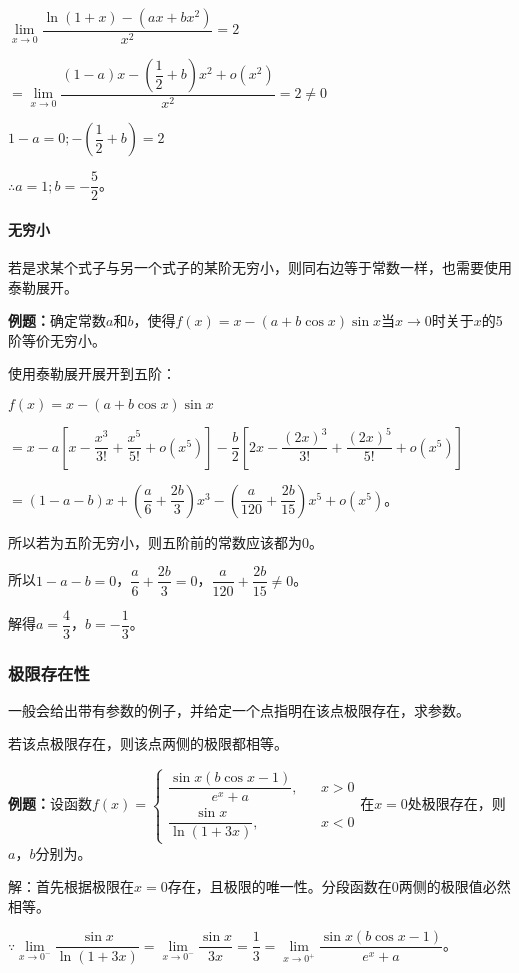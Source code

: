 \documentclass[UTF8, 12pt]{ctexart}
\begin{document}
$\lim\limits_{x\to 0}\dfrac{\ln(1+x)-(ax+bx^2)}{x^2}=2$

$=\lim\limits_{x\to 0}\dfrac{(1-a)x-\left(\dfrac{1}{2}+b\right)x^2+o(x^2)}{x^2}=2\neq 0$

$1-a=0;-\left(\dfrac{1}{2}+b\right)=2$\medskip

$\therefore a=1;b=-\dfrac{5}{2}$。

\paragraph{无穷小} \leavevmode \medskip

若是求某个式子与另一个式子的某阶无穷小，则同右边等于常数一样，也需要使用泰勒展开。

\textbf{例题：}确定常数$a$和$b$，使得$f(x)=x-(a+b\cos x)\sin x$当$x\to 0$时关于$x$的5阶等价无穷小。

使用泰勒展开展开到五阶：

$f(x)=x-(a+b\cos x)\sin x$

$=x-a\left[x-\dfrac{x^3}{3!}+\dfrac{x^5}{5!}+o(x^5)\right]-\dfrac{b}{2}\left[2x-\dfrac{(2x)^3}{3!}+\dfrac{(2x)^5}{5!}+o(x^5)\right]$

$=(1-a-b)x+\left(\dfrac{a}{6}+\dfrac{2b}{3}\right)x^3-\left(\dfrac{a}{120}+\dfrac{2b}{15}\right)x^5+o(x^5)$。\medskip

所以若为五阶无穷小，则五阶前的常数应该都为0。

所以$1-a-b=0$，$\dfrac{a}{6}+\dfrac{2b}{3}=0$，$\dfrac{a}{120}+\dfrac{2b}{15}\neq0$。

解得$a=\dfrac{4}{3}$，$b=-\dfrac{1}{3}$。

\subsubsection{极限存在性}

一般会给出带有参数的例子，并给定一个点指明在该点极限存在，求参数。

若该点极限存在，则该点两侧的极限都相等。\medskip

\textbf{例题：}设函数$f(x)=\left\{\begin{array}{lcl}
    \dfrac{\sin x(b\cos x-1)}{e^x+a}, & & x>0 \\
    \dfrac{\sin x}{\ln(1+3x)}, & & x<0
\end{array}
\right.$在$x=0$处极限存在，则$a$，$b$分别为。

解：首先根据极限在$x=0$存在，且极限的唯一性。分段函数在0两侧的极限值必然相等。

$\because\lim\limits_{x\to 0^-}\dfrac{\sin x}{\ln(1+3x)}=\lim\limits_{x\to 0^-}\dfrac{\sin x}{3x}=\dfrac{1}{3}=\lim\limits_{x\to 0^+}\dfrac{\sin x(b\cos x-1)}{e^x+a}$。
\end{document}
